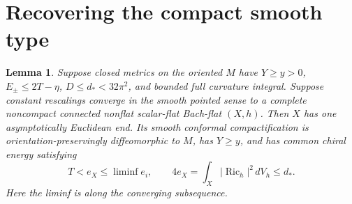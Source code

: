 \documentclass[11pt,letterpaper]{article}
\newtheorem{lemma}[theorem]{Lemma}
\DeclareMathOperator{\Ric}{Ric}
\newcommand{\dV}{\,dV}
\begin{document}
\section{Recovering the compact smooth type}
\begin{lemma}\label{lem:mark}
Suppose closed metrics on the oriented \(M\) have \(Y\ge y>0\),
\(E_\pm\le2T-\eta\), \(D\le d_*<32\pi^2\), and bounded full
curvature integral. Suppose constant rescalings converge in the smooth
pointed sense to a complete noncompact connected nonflat scalar-flat
Bach-flat \((X,h)\). Then \(X\) has one asymptotically Euclidean end.
Its smooth conformal compactification is orientation-preservingly
diffeomorphic to \(M\), has \(Y\ge y\), and has common chiral energy
satisfying
\[
   T<e_X\le\liminf e_i,\qquad 4e_X=\int_X|\Ric_h|^2\dV_h\le d_* .
\]
Here the liminf is along the converging subsequence.
\end{lemma}
\end{document}

